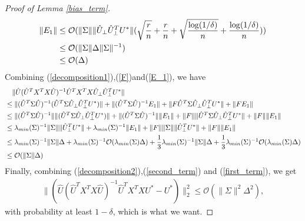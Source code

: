 \begin{proof}[Proof of Lemma \ref{bias_term}]
\begin{align} \label{E_1}
\|E_{1}\| &\leq \mathcal{O}(\|\Sigma\|\|\hat{U}_{\perp}\hat{U}_{\perp}^{T}U^{*}\|(\sqrt{\frac{r}{n}}+ \frac{r}{n} +\sqrt{ \frac{\log(1/\delta)}{n}}+ \frac{\log(1/\delta)}{n})) \notag \\
& \leq \mathcal{O}(\|\Sigma\|\Delta \|\Sigma\|^{-1}) \notag \\
& \leq \mathcal{O} (\Delta)
\end{align}
Combining (\ref{decomposition1}),(\ref{F})and(\ref{E_1}), we have 
\begin{align} \label{first_term}
& \quad \|\hat{U}(\hat{U}^{T}X^{T}X\hat{U})^{-1}\hat{U}^{T}X^{T}X\hat{U}_{\perp}\hat{U}_{\perp}^{T}U^{*}\| \notag \\
&\leq  \|(\hat{U}^{T}\Sigma\hat{U})^{-1}(\hat{U}^{T}\Sigma\hat{U}_{\perp}\hat{U}_{\perp}^{T}U^{*})\|+\|(\hat{U}^{T}\Sigma\hat{U})^{-1}E_{1}\|+ \|F\hat{U}^{T}\Sigma\hat{U}_{\perp}\hat{U}_{\perp}^{T}U^{*}\| + \|FE_{1}\|   \notag \\
&\leq  \|(\hat{U}^{T}\Sigma\hat{U})^{-1}\|\|(\hat{U}^{T}\Sigma\hat{U}_{\perp}\hat{U}_{\perp}^{T}U^{*})\|+\|(\hat{U}^{T}\Sigma\hat{U})^{-1}\|\|E_{1}\|+ \|F\|\|\hat{U}^{T}\Sigma\hat{U}_{\perp}\hat{U}_{\perp}^{T}U^{*}\| + \|F\|\|E_{1}\|   \notag \\
&\leq  \lambda_{min}(\Sigma)^{-1}\|\Sigma\|\|\hat{U}_{\perp}^{T}U^{*}\|+\lambda_{min}(\Sigma)^{-1}\|E_{1}\|+ \|F\|\|\Sigma\|\|\hat{U}_{\perp}^{T}U^{*}\| + \|F\|\|E_{1}\|   \notag \\
&\leq  \lambda_{min}(\Sigma)^{-1}\|\Sigma\| \Delta +\lambda_{min}(\Sigma)^{-1}\mathcal{O} (\lambda_{min}(\Sigma) \Delta)+ \frac{1}{3} \lambda_{min}(\Sigma)^{-1}\|\Sigma\|\Delta + \frac{1}{3} \lambda_{min}(\Sigma)^{-1}\mathcal{O} (\lambda_{min}(\Sigma) \Delta)   \notag \\
&\leq \mathcal{O} (\|\Sigma\| \Delta)
\end{align}
Finally, combining (\ref{decomposition2}),(\ref{second_term}) and (\ref{first_term}), we get 
\begin{align}
\|(\hat{U}(\hat{U}^{T}X^{T}X\hat{U})^{-1}\hat{U}^{T}X^{T}X U^{*} - U^{*})\|_{2}^{2} \leq \mathcal{O} (\|\Sigma\|^2\Delta^{2}),    
\end{align}
with probability at least $1-\delta$, which is what we want.
\end{proof}

